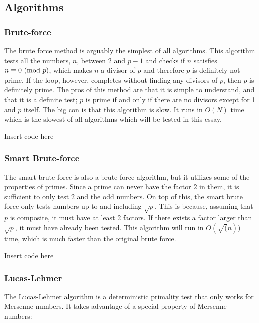 \documentclass[main.tex]{subfiles}
\begin{document}
\subsection{Algorithms}

\subsubsection{Brute-force}
The brute force method is arguably the simplest of all algorithms. This
algorithm tests all the numbers, $n$, between $2$ and $p-1$ and checks if $n$
satisfies $n \equiv 0 \ (\mathrm{mod}\ p)$, which makes $n$ a divisor of $p$ and therefore
$p$ is definitely not prime. If the loop, however, completes without finding any
divisors of $p$, then $p$ is definitely prime. The pros of this method are that
it is simple to understand, and that it is a definite test; $p$ is prime if and
only if there are no divisors except for 1 and $p$ itself. The big con is that
this algorithm is slow. It runs in $O(N)$ time which is the slowest of all
algorithms which will be tested in this essay.

\begin{python}
  Insert code here
\end{python}

\subsubsection{Smart Brute-force}
The smart brute force is also a brute force algorithm, but it utilizes some of
the properties of primes. Since a prime can never have the factor $2$ in them,
it is sufficient to only test $2$ and the odd numbers. On top of this, the smart
brute force only tests numbers up to and including $\sqrt{p}$. This is because,
assuming that $p$ is composite, it must have at least 2 factors. If there exists
a factor larger than $\sqrt{p}$, it must have already been tested. This
algorithm will run in $O(\sqrt(n))$ time, which is much faster than the original
brute force.

\begin{python}
  Insert code here
\end{python}

\subsubsection{Lucas-Lehmer}
The Lucas-Lehmer algorithm is a deterministic primality test that only works for
Mersenne numbers. It takes advantage of a special property of Mersenne numbers:
\end{document}
